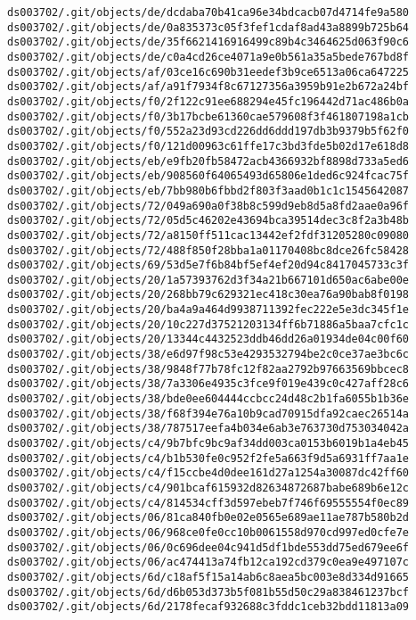 \documentclass[11pt]{article}
\begin{document}
\begin{Verbatim}[commandchars=\\\{\}]
ds003702/.git/objects/de/dcdaba70b41ca96e34bdcacb07d4714fe9a580
ds003702/.git/objects/de/0a835373c05f3fef1cdaf8ad43a8899b725b64
ds003702/.git/objects/de/35f6621416916499c89b4c3464625d063f90c6
ds003702/.git/objects/de/c0a4cd26ce4071a9e0b561a35a5bede767bd8f
ds003702/.git/objects/af/03ce16c690b31eedef3b9ce6513a06ca647225
ds003702/.git/objects/af/a91f7934f8c67127356a3959b91e2b672a24bf
ds003702/.git/objects/f0/2f122c91ee688294e45fc196442d71ac486b0a
ds003702/.git/objects/f0/3b17bcbe61360cae579608f3f461807198a1cb
ds003702/.git/objects/f0/552a23d93cd226dd6ddd197db3b9379b5f62f0
ds003702/.git/objects/f0/121d00963c61ffe17c3bd3fde5b02d17e618d8
ds003702/.git/objects/eb/e9fb20fb58472acb4366932bf8898d733a5ed6
ds003702/.git/objects/eb/908560f64065493d65806e1ded6c924fcac75f
ds003702/.git/objects/eb/7bb980b6fbbd2f803f3aad0b1c1c1545642087
ds003702/.git/objects/72/049a690a0f38b8c599d9eb8d5a8fd2aae0a96f
ds003702/.git/objects/72/05d5c46202e43694bca39514dec3c8f2a3b48b
ds003702/.git/objects/72/a8150ff511cac13442ef2fdf31205280c09080
ds003702/.git/objects/72/488f850f28bba1a01170408bc8dce26fc58428
ds003702/.git/objects/69/53d5e7f6b84bf5ef4ef20d94c8417045733c3f
ds003702/.git/objects/20/1a57393762d3f34a21b667101d650ac6abe00e
ds003702/.git/objects/20/268bb79c629321ec418c30ea76a90bab8f0198
ds003702/.git/objects/20/ba4a9a464d9938711392fec222e5e3dc345f1e
ds003702/.git/objects/20/10c227d37521203134ff6b71886a5baa7cfc1c
ds003702/.git/objects/20/13344c4432523ddb46dd26a01934de04c00f60
ds003702/.git/objects/38/e6d97f98c53e4293532794be2c0ce37ae3bc6c
ds003702/.git/objects/38/9848f77b78fc12f82aa2792b97663569bbcec8
ds003702/.git/objects/38/7a3306e4935c3fce9f019e439c0c427aff28c6
ds003702/.git/objects/38/bde0ee604444ccbcc24d48c2b1fa6055b1b36e
ds003702/.git/objects/38/f68f394e76a10b9cad70915dfa92caec26514a
ds003702/.git/objects/38/787517eefa4b034e6ab3e763730d753034042a
ds003702/.git/objects/c4/9b7bfc9bc9af34dd003ca0153b6019b1a4eb45
ds003702/.git/objects/c4/b1b530fe0c952f2fe5a663f9d5a6931ff7aa1e
ds003702/.git/objects/c4/f15ccbe4d0dee161d27a1254a30087dc42ff60
ds003702/.git/objects/c4/901bcaf615932d82634872687babe689b6e12c
ds003702/.git/objects/c4/814534cff3d597ebeb7f746f69555554f0ec89
ds003702/.git/objects/06/81ca840fb0e02e0565e689ae11ae787b580b2d
ds003702/.git/objects/06/968ce0fe0cc10b0061558d970cd997ed0cfe7e
ds003702/.git/objects/06/0c696dee04c941d5df1bde553dd75ed679ee6f
ds003702/.git/objects/06/ac474413a74fb12ca192cd379c0ea9e497107c
ds003702/.git/objects/6d/c18af5f15a14ab6c8aea5bc003e8d334d91665
ds003702/.git/objects/6d/d6b053d373b5f081b55d50c29a838461237bcf
ds003702/.git/objects/6d/2178fecaf932688c3fddc1ceb32bdd11813a09

\end{Verbatim}
\end{document}
